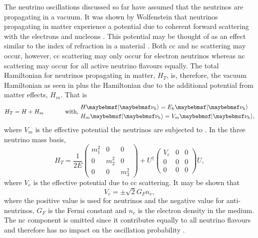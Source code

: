 The neutrino oscillations discussed so far have assumed that the neutrinos are propagating in a vacuum. It was shown by Wolfenstein that neutrinos propagating in matter experience a potential due to coherent forward scattering with the electrons and nucleons \cite{Wolfenstein}. This potential may be thought of as an effect similar to the index of refraction in a material \cite{Fundamentals_of_Neutrino_Physics_and_Astrophysics}. Both \gls{cc} and \gls{nc} scattering may occur, however, \gls{cc} scattering may only occur for electron neutrinos whereas \gls{nc} scattering may occur for all active neutrino flavours equally. The total Hamiltonian for neutrinos propagating in matter, $H_T$, is, therefore, the vacuum Hamiltonian as seen in  plus the Hamiltonian due to the additional potential from matter effects, $H_m$. That is 
\begin{equation}
    H_T = H + H_m \text{ \hspace{1cm} with, } \begin{split}
        & H\ket{\nu_k} = E_k\ket{\nu_k} \\
        & H_m\ket{\nu_k} = V_m\ket{\nu_k},
    \end{split}
\end{equation} 
where $V_m$ is the effective potential the neutrinos are subjected to \cite{Fundamentals_of_Neutrino_Physics_and_Astrophysics}. In the three neutrino mass basis,
\begin{equation}
H_T = \frac{1}{2E} 
\begin{pmatrix}
m_1^2 & 0 & 0 \\
0 & m_2^2 & 0 \\
0 & 0 & m_3^2
\end{pmatrix}
+ U^\dag
\begin{pmatrix}
V_e & 0 & 0 \\
0 & 0 & 0 \\
0 & 0 & 0
\end{pmatrix}
U,
\end{equation}
where $V_e$ is the effective potential due to \gls{cc} scattering. It may be shown that 
\begin{equation}
    V_e = \pm \sqrt{2}G_Fn_e,
\end{equation}
where the positive value is used for neutrinos and the negative value for anti-neutrinos, $G_F$ is the Fermi constant and $n_e$ is the electron density in the medium.
The \gls{nc} component is omitted since it contributes equally to all neutrino flavours and therefore has no impact on the oscillation probability \cite{PDG_2022}. 

